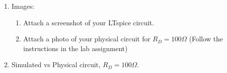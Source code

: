 \documentclass{article}
\begin{document}
\begin{enumerate}
    \item Images:
    \begin{enumerate}
        \item Attach a screenshot of your LTspice circuit.
        \bigbreak
        \begin{center}
        \end{center}
        \bigbreak
        \item Attach a photo of your physical circuit for $R_D = 100\Omega$ (Follow the instructions in the lab assignment)
\begin{center}
\end{center}
    \end{enumerate}
    \newpage
    \item Simulated vs Physical circuit, $R_D = 100\Omega$.
    \begin{enumerate}

\end{enumerate}
\end{enumerate}
\end{document}

